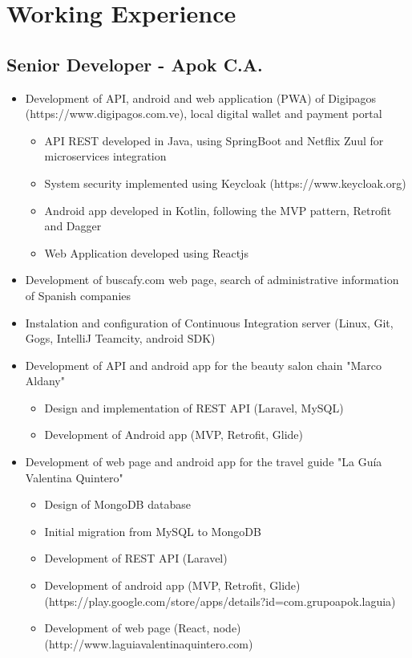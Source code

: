 \documentclass[letterpaper,11pt]{report}
\begin{document}
\section*{Working Experience}
\subsection*{Senior Developer - Apok C.A.}
  \begin{itemize}
    \item Development of API, android and web application (PWA) of Digipagos (https://www.digipagos.com.ve), local digital wallet and payment portal
      \begin{itemize}
        \item API REST developed in Java, using SpringBoot and Netflix Zuul for microservices integration
        \item System security implemented using Keycloak (https://www.keycloak.org)
        \item Android app developed in Kotlin, following the MVP pattern, Retrofit and Dagger
        \item Web Application developed using Reactjs
      \end{itemize}
    \item Development of buscafy.com web page, search of administrative information of Spanish companies
    \item Instalation and configuration of Continuous Integration server (Linux, Git, Gogs, IntelliJ Teamcity, android SDK)
    \item Development of API and android app for the beauty salon chain "Marco Aldany"
      \begin{itemize}
        \item Design and implementation of REST API (Laravel, MySQL)
        \item Development of Android app (MVP, Retrofit, Glide)
      \end{itemize}
    \item Development of web page and android app for the travel guide "La Guía Valentina Quintero"
      \begin{itemize}
        \item Design of MongoDB database
        \item Initial migration from MySQL to MongoDB
        \item Development of REST API (Laravel)
        \item Development of android app (MVP, Retrofit, Glide) (https://play.google.com/store/apps/details?id=com.grupoapok.laguia)
        \item Development of web page (React, node) (http://www.laguiavalentinaquintero.com)
      \end{itemize}
  \end{itemize}
\end{document}

